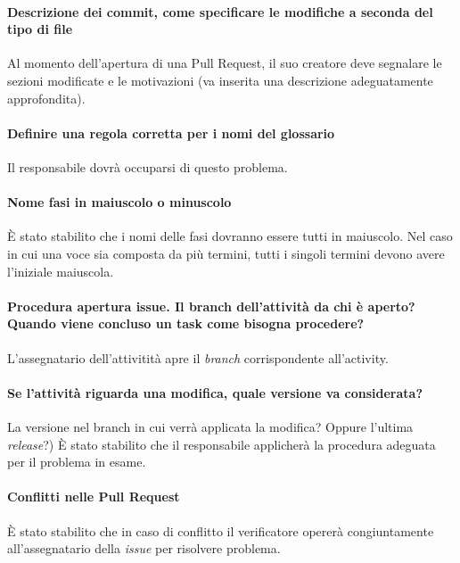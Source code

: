 \documentclass[11pt]{meetingmins}
\begin{document}
	\paragraph*{Descrizione dei commit, come specificare le modifiche a seconda del tipo di file}
		Al momento dell'apertura di una Pull Request, il suo creatore deve segnalare le sezioni modificate e
		le motivazioni (va inserita una descrizione adeguatamente approfondita).

	\paragraph*{Definire una regola corretta per i nomi del glossario}
		Il responsabile dovr\`a occuparsi di questo problema.

	\paragraph*{Nome fasi in maiuscolo o minuscolo}
		\`E stato stabilito che i nomi delle fasi dovranno essere tutti in maiuscolo.		
		Nel caso in cui una voce sia composta da pi\`u termini, tutti i singoli termini devono avere l'iniziale maiuscola.

	\paragraph*{Procedura apertura issue. Il branch dell'attivit\`a da chi \`e aperto? Quando viene concluso un task come bisogna procedere?}
		L'assegnatario dell'attivitit\`a apre il \textit{branch} corrispondente all'activity.				

	\paragraph*{Se l'attivit\`a riguarda una modifica, quale versione va considerata?}
		La versione nel branch in cui verr\`a applicata la modifica? Oppure l'ultima \textit{release}?)
		\`E stato stabilito che il responsabile applicher\`a la procedura adeguata per il problema in esame.	

	\paragraph*{Conflitti nelle Pull Request}
		\`E stato stabilito che in caso di conflitto il verificatore operer\`a congiuntamente all'assegnatario della
		\textit{issue} per risolvere problema.		
	        
	
\end{document}
